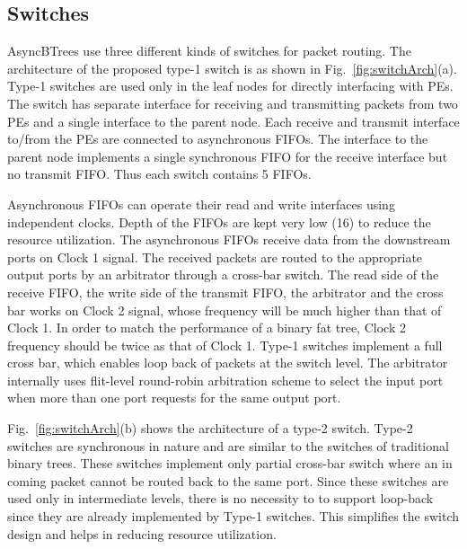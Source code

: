 \subsection{Switches}
\label{sec:switch}
AsyncBTrees use three different kinds of switches for packet routing.
The architecture of the proposed type-1 switch is as shown in Fig.~\ref{fig:switchArch}(a).
Type-1 switches are used only in the leaf nodes for directly interfacing with PEs.
The switch has separate interface for receiving and transmitting packets from two PEs and a single interface to the parent node.
Each receive and transmit interface to/from the PEs are connected to asynchronous FIFOs.
The interface to the parent node implements a single synchronous FIFO for the receive interface but no transmit FIFO.
Thus each switch contains 5 FIFOs.

Asynchronous FIFOs can operate their read and write interfaces using independent clocks.
Depth of the FIFOs are kept very low (16) to reduce the resource utilization.
The asynchronous FIFOs receive data from the downstream ports on Clock 1 signal.
The received packets are routed to the appropriate output ports by an arbitrator through a cross-bar switch.
The read side of the receive FIFO, the write side of the transmit FIFO, the arbitrator and the cross bar works on Clock 2 signal, whose frequency will be much higher than that of Clock 1.
In order to match the performance of a binary fat tree, Clock 2 frequency should be twice as that of Clock 1.
Type-1 switches implement a full cross bar, which enables loop back of packets at the switch level.
The arbitrator internally uses flit-level round-robin arbitration scheme to select the input port when more than one port requests for the same output port.

Fig.~\ref{fig:switchArch}(b) shows the architecture of a type-2 switch.
Type-2 switches are synchronous in nature and are similar to the switches of traditional binary trees.
These switches implement only partial cross-bar switch where an in coming packet cannot be routed back to the same port.
Since these switches are used only in intermediate levels, there is no necessity to to support loop-back since they are already implemented by Type-1 switches.
This simplifies the switch design and helps in reducing resource utilization.

